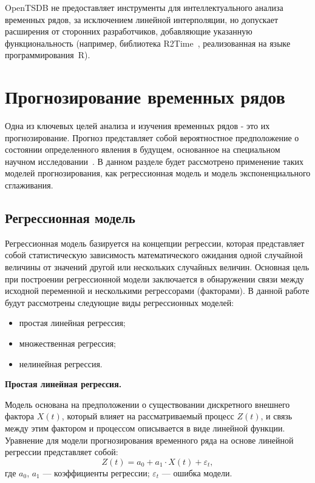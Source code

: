 \documentclass[a4paper,14pt, unknownkeysallowed]{extreport}
\begin{document}
	OpenTSDB не предоставляет инструменты для интеллектуального анализа временных рядов, за исключением линейной интерполяции, но допускает расширения от сторонних разработчиков, добавляющие указанную функциональность (например, библиотека R2Time~\cite{11}, реализованная на языке программирования~R). 
	
	\section*{Прогнозирование временных рядов}
	
	Одна из ключевых целей анализа и изучения временных рядов - это их прогнозирование. 
	Прогноз представляет собой вероятностное предположение о состоянии определенного явления в будущем, основанное на специальном научном исследовании~\cite{12}. 
	В данном разделе будет рассмотрено применение таких моделей прогнозирования, как регрессионная модель и модель экспоненциального сглаживания.
	
	\subsection*{Регрессионная модель}
	
	Регрессионная модель базируется на концепции регрессии, которая представляет собой статистическую зависимость математического ожидания одной случайной величины от значений другой или нескольких случайных величин. 
	Основная цель при построении регрессионной модели заключается в обнаружении связи между исходной переменной и несколькими регрессорами (факторами).
	В данной работе будут рассмотрены следующие виды регрессионных моделей:
	\begin{itemize}[label*=---]
	\item простая линейная регрессия;
	\item множественная регрессия;
	\item нелинейная регрессия.
	\end{itemize}
	
	\textbf{Простая линейная регрессия.}
	
	Модель основана на предположении о существовании дискретного внешнего фактора $X(t)$, который влияет на рассматриваемый процесс $Z(t)$, и связь между этим фактором и процессом описывается в виде линейной функции. Уравнение для модели прогнозирования временного ряда на основе линейной регрессии представляет собой:
	\begin{equation}
		Z(t) = a_0 + a_1 \cdot X(t) + \varepsilon_t,
	\end{equation}
	где $a_0$, $a_1$ --- коэффициенты регрессии; $\varepsilon_t$ --- ошибка модели.
	
\end{document}
